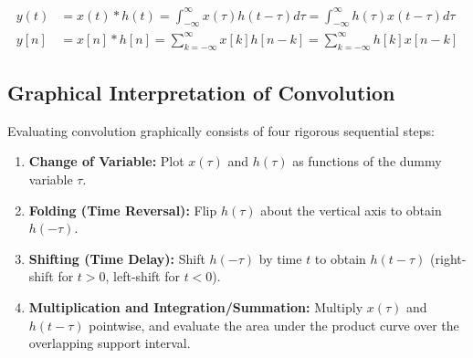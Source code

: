 \documentclass[12pt,a4paper]{article}
\begin{document}
\begin{tcolorbox}[formulabox, title={\textbf{Core Formulation: Convolution Integral and Sum}}]
\begin{align}
  y(t) &= x(t) * h(t) = \int_{-\infty}^{\infty} x(\tau) h(t - \tau) d\tau = \int_{-\infty}^{\infty} h(\tau) x(t - \tau) d\tau \\
  y[n] &= x[n] * h[n] = \sum_{k=-\infty}^{\infty} x[k] h[n - k] = \sum_{k=-\infty}^{\infty} h[k] x[n - k]
\end{align}
\end{tcolorbox}

\subsection{Graphical Interpretation of Convolution}
Evaluating convolution graphically consists of four rigorous sequential steps:
\begin{enumerate}[topsep=2pt, itemsep=3pt]
  \item \textbf{Change of Variable:} Plot $x(\tau)$ and $h(\tau)$ as functions of the dummy variable $\tau$.
  \item \textbf{Folding (Time Reversal):} Flip $h(\tau)$ about the vertical axis to obtain $h(-\tau)$.
  \item \textbf{Shifting (Time Delay):} Shift $h(-\tau)$ by time $t$ to obtain $h(t - \tau)$ (right-shift for $t > 0$, left-shift for $t < 0$).
  \item \textbf{Multiplication and Integration/Summation:} Multiply $x(\tau)$ and $h(t - \tau)$ pointwise, and evaluate the area under the product curve over the overlapping support interval.
\end{enumerate}
\end{document}
